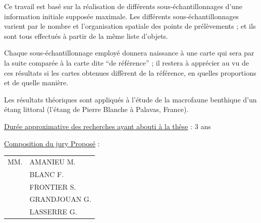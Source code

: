 Ce travail est basé sur la réalisation de différents sous-échantillonnages d'une information initiale supposée maximale. Les différents sous-échantillonnages varient par le nombre et l'organisation spatiale des points de prélèvements ; et ils sont tous effectués à partir de la même liste d'objets.

Chaque sous-échantillonnage employé donnera naissance à une carte qui sera par la suite comparée à la carte dite ``de référence'' ; il restera à apprécier au vu de ces résultats si les cartes obtenues diffèrent de la référence, en quelles proportions et de quelle manière.

Les résultats théoriques sont appliqués à l'étude de la macrofaune benthique d'un étang littoral (l'étang de Pierre Blanche à Palavas, France).

\uline{Durée approximative des recherches ayant abouti à la thèse} : 3 ans

\uline{Composition du jury Proposé} : \begin{tabular}[t]{ll}
MM. & AMANIEU M.\\
& BLANC F.\\
& FRONTIER S.\\
& GRANDJOUAN G.\\
& LASSERRE G.
\end{tabular}

